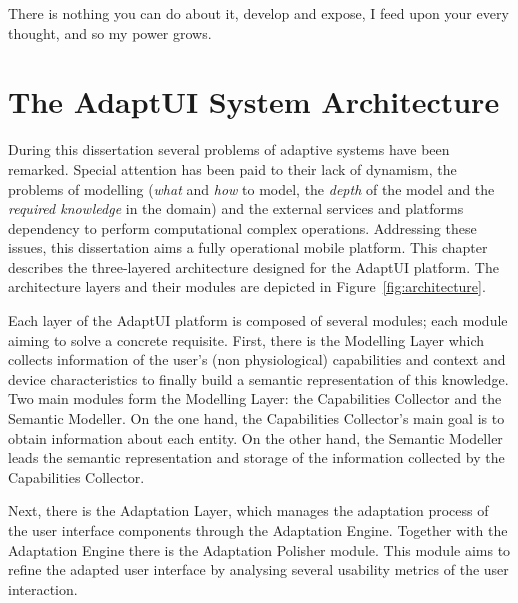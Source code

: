 
\begin{savequote}[50mm]
There is nothing you can do about it, develop and expose, I feed upon your every 
thought, and so my power grows.
\end{savequote}


\chapter{The AdaptUI System Architecture}
\label{cha:architecture}

\ifpdf
    \graphicspath{{4_system_architecture/figures/PNG/}{4_system_architecture/figures/PDF/}{4_system_architecture/figures/}}
\else
    \graphicspath{{4_system_architecture/figures/EPS/}{4_system_architecture/figures/}}
\fi

During this dissertation several problems of adaptive systems have been remarked.
Special attention has been paid to their lack of dynamism, the problems of 
modelling (\textit{what} and \textit{how} to model, the \textit{depth} of the 
model and the \textit{required knowledge} in the domain) and the external 
services and platforms dependency to perform computational complex operations. 
Addressing these issues, this dissertation aims a fully operational mobile 
platform. This chapter describes the three-layered architecture designed for 
the AdaptUI platform. The architecture layers and their modules are depicted in 
Figure~\ref{fig:architecture}.

Each layer of the AdaptUI platform is composed of several modules; each module
aiming to solve a concrete requisite. First, there is the Modelling Layer which
collects information of the user's (non physiological) capabilities and context
and device characteristics to finally build a semantic representation of this
knowledge. Two main modules form the Modelling Layer: the Capabilities Collector
and the Semantic Modeller. On the one hand, the Capabilities Collector's main
goal is to obtain information about each entity. On the other hand, the Semantic
Modeller leads the semantic representation and storage of the information
collected by the Capabilities Collector.

Next, there is the Adaptation Layer, which manages the adaptation process of the
user interface components through the Adaptation Engine. Together with the
Adaptation Engine there is the Adaptation Polisher module. This module aims to
refine the adapted user interface by analysing several usability metrics of the
user interaction.


